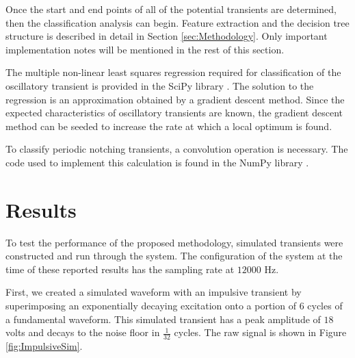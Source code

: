 \documentclass[10pt, conference, compsocconf]{IEEEtran}
\begin{document}
Once the start and end points of all of the potential transients are determined, then the classification analysis can begin. Feature extraction and the decision tree structure is described in detail in Section \ref{sec:Methodology}. Only important implementation notes will be mentioned in the rest of this section.

The multiple non-linear least squares regression required for classification of the oscillatory transient is provided in the SciPy library \cite{scipy:2019}. The solution to the regression is an approximation obtained by a gradient descent method. Since the expected characteristics of oscillatory transients are known, the gradient descent method can be seeded to increase the rate at which a local optimum is found.

To classify periodic notching transients, a convolution operation is necessary. The code used to implement this calculation is found in the NumPy library \cite{numpy}.

\section{Results}
\label{sec:Results}
To test the performance of the proposed methodology, simulated transients were constructed and run through the system. The configuration of the system at the time of these reported results has the sampling rate at $12000$ Hz.

First, we created a simulated waveform with an impulsive transient by superimposing an exponentially decaying excitation onto a portion of $6$ cycles of a fundamental waveform. This simulated transient has a peak amplitude of $18$ volts and decays to the noise floor in $\frac{1}{32}$ cycles. The raw signal is shown in Figure \ref{fig:ImpulsiveSim}.
\end{document}
